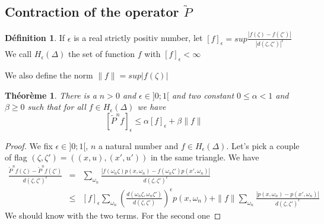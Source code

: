 \documentclass[12pt]{article}
\theoremstyle{plain}%
\newtheorem{thm}{Théorème}[section]
\theoremstyle{definition}
\newtheorem{dfnt}{Définition}[section]
\theoremstyle{remark}
\begin{document}
\subsection{Contraction of the operator $\tilde{P}$ }
\begin{dfnt}
If $\epsilon$ is a real strictly positiv number, let $[f]_\epsilon= sup \frac{|f(\zeta)-f(\zeta ')|}{|d(\zeta,\zeta ')|^\epsilon}$ \newline
We call $H_\epsilon(\Delta)$ the set of function $f$ with $[f]_\epsilon < \infty$
\end{dfnt}
We also define the norm $\| f \|=sup |f(\zeta)|$
\begin{thm}
There is a $n >0$ and $\epsilon \in ]0;1[$ and two constant
 $0 \leq \alpha < 1$ and $\beta \geq 0$ such that for all $f\in H_\epsilon(\Delta)$
 we have \[
[\tilde{P}^n f]_\epsilon \leq \alpha [f]_\epsilon +\beta \| f \|
 \]
 \end{thm}
 \begin{proof}
 We fix $\epsilon \in ]0;1[$, $n$ a natural number and $f\in H_\epsilon(\Delta)$. Let's pick a couple of flag $(\zeta, \zeta' )= ((x,u),(x',u'))$ in the same triangle. We have \[
\begin{aligned}
\frac{\tilde{P}^n f(\zeta)-\tilde{P}^n f(\zeta')}{d(\zeta,\zeta')^\epsilon} & =& \sum_{\omega_n} \frac{|f(\omega_n \zeta)p(x,\omega_n)-f(\omega_n \zeta ')p(x',\omega_n)|}{d(\zeta,\zeta')^\epsilon} \\
&\leq & [f]_\epsilon \sum_{\omega_n} (\frac{d(\omega_n \zeta, \omega_n \zeta')}{d(\zeta,\zeta')})^\epsilon p(x,\omega_n) + \| f \| \sum_{\omega_n} \frac{|p(x,\omega_n)-p(x',\omega_n)|}{d(\zeta,\zeta')^\epsilon}
\end{aligned}
 \]
 We should know with the two terms. For the second one
 \end{proof}
\end{document}
